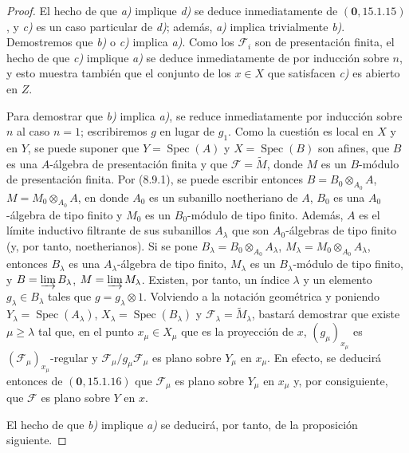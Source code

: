 \begin{proof}
El hecho de que \emph{a)} implique \emph{d)} se deduce inmediatamente de $(\mathbf 0,15.1.15)$, y \emph{c)} es un caso particular de \emph{d)}; además, \emph{a)} implica trivialmente \emph{b)}. Demostremos que \emph{b)} o \emph{c)} implica \emph{a)}. Como los $\mathcal F_i$ son de presentación finita, el hecho de que \emph{c)} implique \emph{a)} se deduce inmediatamente de  por inducción sobre $n$, y esto muestra también que el conjunto de los $x\in X$ que satisfacen \emph{c)} es abierto en $Z$.

Para demostrar que \emph{b)} implica \emph{a)}, se reduce inmediatamente por inducción sobre $n$ al caso $n=1$; escribiremos $g$ en lugar de $g_1$. Como la cuestión es local en $X$ y en $Y$, se puede suponer que $Y=\operatorname{Spec}(A)$ y $X=\operatorname{Spec}(B)$ son afines, que $B$ es una $A$-álgebra de presentación finita y que $\mathcal F=\widetilde M$, donde $M$ es un $B$-módulo de presentación finita. Por (8.9.1), se puede escribir entonces
$B=B_0\otimes_{A_0}A$, $M=M_0\otimes_{A_0}A$,
en donde $A_0$ es un subanillo noetheriano de $A$, $B_0$ es una $A_0$-álgebra de tipo finito y $M_0$ es un $B_0$-módulo de tipo finito. Además, $A$ es el límite inductivo filtrante de sus subanillos $A_\lambda$ que son $A_0$-álgebras de tipo finito (y, por tanto, noetherianos). Si se pone
$B_\lambda=B_0\otimes_{A_0}A_\lambda$,
$M_\lambda=M_0\otimes_{A_0}A_\lambda$,
entonces $B_\lambda$ es una $A_\lambda$-álgebra de tipo finito, $M_\lambda$ es un $B_\lambda$-módulo de tipo finito, y
$B=\varinjlim B_\lambda$, $M=\varinjlim M_\lambda$.
Existen, por tanto, un índice $\lambda$ y un elemento $g_\lambda\in B_\lambda$ tales que $g=g_\lambda\otimes1$. Volviendo a la notación geométrica y poniendo
$Y_\lambda=\operatorname{Spec}(A_\lambda)$,
$X_\lambda=\operatorname{Spec}(B_\lambda)$ y
$\mathcal F_\lambda=\widetilde{M}_\lambda$,
bastará demostrar que existe $\mu\geq\lambda$ tal que, en el punto $x_\mu\in X_\mu$ que es la proyección de $x$, $(g_\mu)_{x_\mu}$ es $(\mathcal F_\mu)_{x_\mu}$-regular y $\mathcal F_\mu/g_\mu\mathcal F_\mu$ es plano sobre $Y_\mu$ en $x_\mu$. En efecto, se deducirá entonces de $(\mathbf 0,15.1.16)$ que $\mathcal F_\mu$ es plano sobre $Y_\mu$ en $x_\mu$ y, por consiguiente, que $\mathcal F$ es plano sobre $Y$ en $x$.

El hecho de que \emph{b)} implique \emph{a)} se deducirá, por tanto, de la proposición siguiente.


\end{proof}
